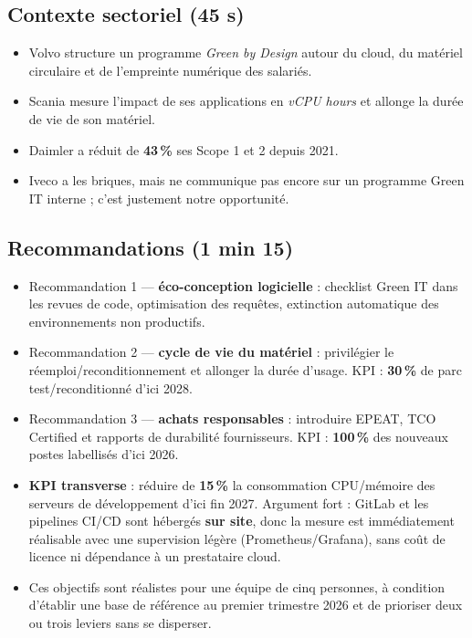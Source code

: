 \documentclass[12pt,a4paper]{article}
\begin{document}
\subsection*{Contexte sectoriel (45 s)}

\begin{itemize}
  \item Volvo structure un programme \textit{Green by Design} autour du cloud, du matériel circulaire et de l'empreinte numérique des salariés.
  \item Scania mesure l'impact de ses applications en \textit{vCPU hours} et allonge la durée de vie de son matériel.
  \item Daimler a réduit de \textbf{43\,\%} ses Scope 1 et 2 depuis 2021.
  \item Iveco a les briques, mais ne communique pas encore sur un programme Green IT interne ; c'est justement notre opportunité.
\end{itemize}

\subsection*{Recommandations (1 min 15)}

\begin{itemize}
  \item Recommandation 1 --- \textbf{éco-conception logicielle} : checklist Green IT dans les revues de code, optimisation des requêtes, extinction automatique des environnements non productifs.
  \item Recommandation 2 --- \textbf{cycle de vie du matériel} : privilégier le réemploi/reconditionnement et allonger la durée d'usage. KPI : \textbf{30\,\%} de parc test/reconditionné d'ici 2028.
  \item Recommandation 3 --- \textbf{achats responsables} : introduire EPEAT, TCO Certified et rapports de durabilité fournisseurs. KPI : \textbf{100\,\%} des nouveaux postes labellisés d'ici 2026.
  \item \textbf{KPI transverse} : réduire de \textbf{15\,\%} la consommation CPU/mémoire des serveurs de développement d'ici fin 2027. Argument fort : GitLab et les pipelines CI/CD sont hébergés \textbf{sur site}, donc la mesure est immédiatement réalisable avec une supervision légère (Prometheus/Grafana), sans coût de licence ni dépendance à un prestataire cloud.
  \item Ces objectifs sont réalistes pour une équipe de cinq personnes, à condition d'établir une base de référence au premier trimestre 2026 et de prioriser deux ou trois leviers sans se disperser.
\end{itemize}
\end{document}
